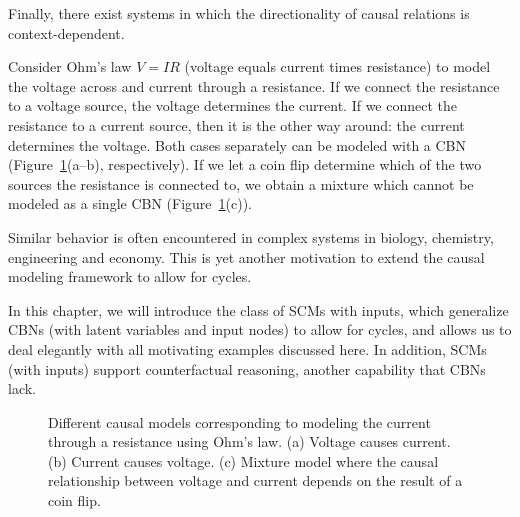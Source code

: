 Finally, there exist systems in which the directionality of causal relations is context-dependent.
\begin{Eg}\label{eg:ohms_law}
Consider Ohm's law $V = I R$ (voltage equals current times resistance) to model the voltage across and current through a resistance.
If we connect the resistance to a voltage source, the voltage determines the current.
If we connect the resistance to a current source, then it is the other way around: the current determines the voltage.
Both cases separately can be modeled with a CBN (Figure~\ref{fig:context_specific_causality}(a--b), respectively).
If we let a coin flip determine which of the two sources the resistance is connected to, we obtain a mixture which cannot be modeled as a single CBN (Figure~\ref{fig:context_specific_causality}(c)).
\end{Eg}
Similar behavior is often encountered in complex systems in biology, chemistry, engineering and economy.
This is yet another motivation to extend the causal modeling framework to allow for cycles.

In this chapter, we will introduce the class of SCMs with inputs, which generalize CBNs (with latent variables and input nodes) to allow for cycles, and allows us to deal elegantly with all motivating examples discussed here.
In addition, SCMs (with inputs) support counterfactual reasoning, another capability that CBNs lack.

\begin{figure}[tb]
\centering
{}
  \caption{Different causal models corresponding to modeling the current through a resistance using Ohm's law. (a) Voltage causes current. (b) Current causes voltage. (c) Mixture model where the causal relationship between voltage and current depends on the result of a coin flip.}
\label{fig:context_specific_causality}
\end{figure}

